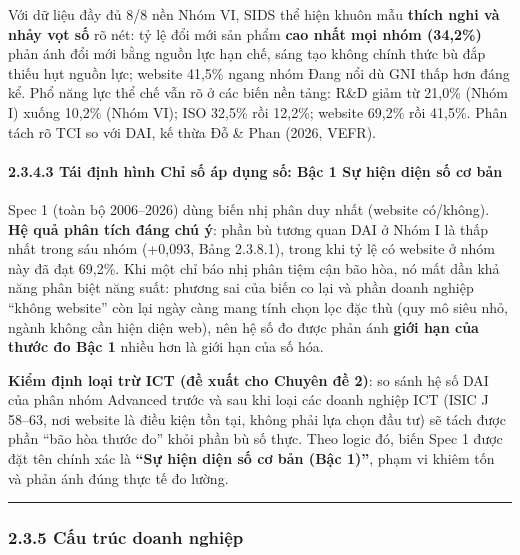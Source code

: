\documentclass[
  a4paper,
  13pt]{extreport}
\begin{document}
Với dữ liệu đầy đủ 8/8 nền Nhóm VI, SIDS thể hiện khuôn mẫu
\textbf{thích nghi và nhảy vọt số} rõ nét: tỷ lệ đổi mới sản phẩm
\textbf{cao nhất mọi nhóm (34,2\%)} phản ánh đổi mới bằng nguồn lực hạn
chế, sáng tạo không chính thức bù đắp thiếu hụt nguồn lực; website
41,5\% ngang nhóm Đang nổi dù GNI thấp hơn đáng kể. Phổ năng lực thể chế
vẫn rõ ở các biến nền tảng: R\&D giảm từ 21,0\% (Nhóm I) xuống 10,2\%
(Nhóm VI); ISO 32,5\% rồi 12,2\%; website 69,2\% rồi 41,5\%. Phân tách
rõ TCI so với DAI, kế thừa Đỗ \& Phan (2026, VEFR).

\hypertarget{tuxe1i-ux111ux1ecbnh-huxecnh-chux1ec9-sux1ed1-uxe1p-dux1ee5ng-sux1ed1-bux1eadc-1-sux1ef1-hiux1ec7n-diux1ec7n-sux1ed1-cux1a1-bux1ea3n}{%
\paragraph{2.3.4.3 Tái định hình Chỉ số áp dụng số: Bậc 1 Sự hiện diện
số cơ
bản}\label{tuxe1i-ux111ux1ecbnh-huxecnh-chux1ec9-sux1ed1-uxe1p-dux1ee5ng-sux1ed1-bux1eadc-1-sux1ef1-hiux1ec7n-diux1ec7n-sux1ed1-cux1a1-bux1ea3n}}

Spec 1 (toàn bộ 2006--2026) dùng biến nhị phân duy nhất (website
có/không). \textbf{Hệ quả phân tích đáng chú ý}: phần bù tương quan DAI
ở Nhóm I là thấp nhất trong sáu nhóm (+0,093, Bảng 2.3.8.1), trong khi
tỷ lệ có website ở nhóm này đã đạt 69,2\%. Khi một chỉ báo nhị phân tiệm
cận bão hòa, nó mất dần khả năng phân biệt năng suất: phương sai của
biến co lại và phần doanh nghiệp ``không website'' còn lại ngày càng
mang tính chọn lọc đặc thù (quy mô siêu nhỏ, ngành không cần hiện diện
web), nên hệ số đo được phản ánh \textbf{giới hạn của thước đo Bậc 1}
nhiều hơn là giới hạn của số hóa.

\textbf{Kiểm định loại trừ ICT (đề xuất cho Chuyên đề 2)}: so sánh hệ số
DAI của phân nhóm Advanced trước và sau khi loại các doanh nghiệp ICT
(ISIC J 58--63, nơi website là điều kiện tồn tại, không phải lựa chọn
đầu tư) sẽ tách được phần ``bão hòa thước đo'' khỏi phần bù số thực.
Theo logic đó, biến Spec 1 được đặt tên chính xác là \textbf{``Sự hiện
diện số cơ bản (Bậc 1)''}, phạm vi khiêm tốn và phản ánh đúng thực tế đo
lường.

\begin{center}\rule{0.5\linewidth}{0.5pt}\end{center}

\hypertarget{cux1ea5u-truxfac-doanh-nghiux1ec7p}{%
\subsubsection{2.3.5 Cấu trúc doanh
nghiệp}\label{cux1ea5u-truxfac-doanh-nghiux1ec7p}}
\end{document}
